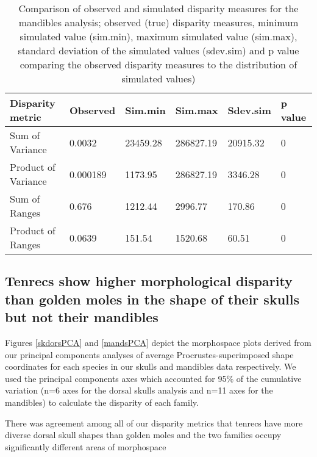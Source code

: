 \documentclass[12pt,a4paper]{article}
\begin{document}
\begin{table}[H]				

\centering
\caption{Comparison of observed and simulated disparity measures for the mandibles analysis; observed (true) disparity measures, minimum simulated value (sim.min), maximum simulated value (sim.max), standard deviation of the simulated values (sdev.sim) and p value comparing the observed disparity measures to the distribution of simulated values)}

\begin{tabular}[t]{l l l l l l }		%
\hline
\textbf{Disparity metric} & \textbf{Observed} & \textbf{Sim.min} & \textbf{Sim.max} & \textbf{Sdev.sim} & \textbf{p value} \\
\hline
Sum of Variance & 0.0032 & 23459.28 & 286827.19 & 20915.32 &	0\\
Product of Variance	& 0.000189 & 1173.95 &	286827.19 &	3346.28 & 0\\
Sum of Ranges &	0.676 &	1212.44 &	2996.77 &	170.86 & 0 \\
Product of Ranges & 0.0639 & 151.54 & 1520.68 &	60.51 &	0\\
\hline
\end{tabular}
\label{mandssims}
\end{table}



\subsection{Tenrecs show higher morphological disparity than golden moles in the shape of their skulls but not their mandibles}


Figures  \ref{skdorsPCA} and \ref{mandsPCA} depict the morphospace plots derived from our principal components analyses of average Procrustes-superimposed shape coordinates for each species in our skulls and mandibles data respectively.  
We used the principal components axes which accounted for 95\% of the cumulative variation (n=6 axes for the dorsal skulls analysis and n=11 axes for the mandibles) to calculate the disparity of each family. 

There was agreement among all of our disparity metrics that tenrecs have more diverse dorsal skull shapes than golden moles
and the two families occupy significantly different areas of morphospace
\end{document}
